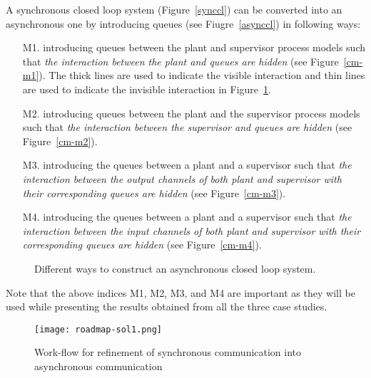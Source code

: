 \documentclass[a4paper,english,final]{article}
\theoremstyle{plain}
\theoremstyle{definition}
\begin{document}
A synchronous closed loop system (Figure~\ref{synccl}) can be converted into an asynchronous one by introducing queues (see Fiugre~\ref{asynccl}) in following ways:
\begin{itemize}
\item[M1.] introducing queues between the plant and supervisor process models such that \textit{the interaction between the plant and queues are hidden} (see Figure~\ref{cm-m1}). The thick lines are used to indicate the visible interaction and thin lines are used to indicate the invisible interaction in Figure~\ref{cm}.
\item[M2.] introducing queues between the plant and the supervisor process models such that \textit{the interaction between the supervisor and queues are hidden} (see Figure~\ref{cm-m2}).
\item[M3.] introducing the queues between a plant and a supervisor such that \textit{the interaction between the output channels of both plant and supervisor with their corresponding queues are hidden} (see Figure~\ref{cm-m3}).
\item[M4.] introducing the queues between a plant and a supervisor such that \textit{the interaction between the input channels of both plant and supervisor with their corresponding queues are hidden} (see Figure~\ref{cm-m4}).
\end{itemize}
\begin{figure}\centering
{}
\hspace{1cm}  
\hspace{1cm} 
\hspace{1cm} 
\caption{Different ways to construct an asynchronous closed loop system.}\label{cm}
\end{figure}
Note that the above indices {M1, M2, M3, and M4} are important as they will be used while presenting the results obtained from all the three case studies.

\begin{figure}
\begin{center}
  \texttt{[image: roadmap-sol1.png]}
\caption{Work-flow for refinement of synchronous communication into asynchronous communication}\label{workflow}
\end{center}
\end{figure}
\end{document}
